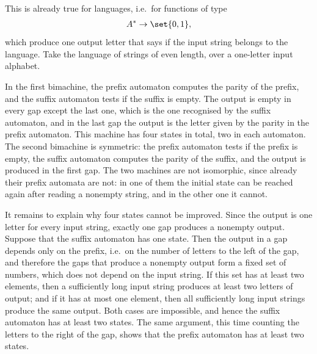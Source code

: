 {This is already true for languages, i.e.~for functions of type
\begin{align*}
A^* \to \set{0,1},
\end{align*}
which produce one output letter that says if the input string belongs to the language. Take the language of strings of even length, over a one-letter input alphabet.

In the first bimachine, the prefix automaton computes the parity of the prefix, and the suffix automaton tests if the suffix is empty. The output is empty in every gap except the last one, which is the one recognised by the suffix automaton, and in the last gap the output is the letter given by the parity in the prefix automaton. This machine has four states in total, two in each automaton. The second bimachine is symmetric: the prefix automaton tests if the prefix is empty, the suffix automaton computes the parity of the suffix, and the output is produced in the first gap. The two machines are not isomorphic, since already their prefix automata are not: in one of them the initial state can be reached again after reading a nonempty string, and in the other one it cannot.

It remains to explain why four states cannot be improved. Since the output is one letter for every input string, exactly one gap produces a nonempty output. Suppose that the suffix automaton has one state. Then the output in a gap depends only on the prefix, i.e.~on the number of letters to the left of the gap, and therefore the gaps that produce a nonempty output form a fixed set of numbers, which does not depend on the input string. If this set has at least two elements, then a sufficiently long input string produces at least two letters of output; and if it has at most one element, then all sufficiently long input strings produce the same output. Both cases are impossible, and hence the suffix automaton has at least two states. The same argument, this time counting the letters to the right of the gap, shows that the prefix automaton has at least two states.
}

